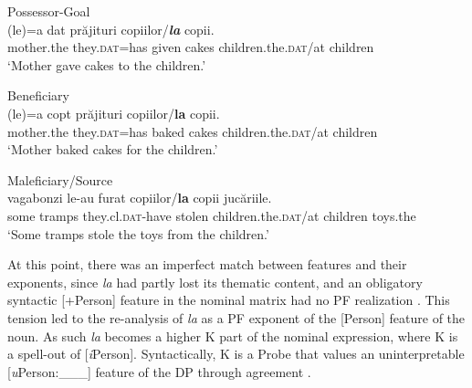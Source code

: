 \documentclass[output=paper,colorlinks,citecolor=brown,nonflat]{./langscibook}
\begin{document}
\ea %
      \label{ex:cornilescu:12}
      Possessor-Goal\\
       {(le)=a} {dat} {prăjituri} copiilor/\textbf{\textit{la}} {copii.} \\
           mother.the they.\textsc{dat}=has given cakes children.the.\textsc{dat}/at children\\
      \glt ‘Mother gave cakes to the children.’
      \z



\ea%
      \label{ex:cornilescu:13}
      Beneficiary \\
       {(le)=a} {copt} prăjituri copiilor/\textbf{{la}} {copii}.\\
             mother.the they.\textsc{dat}=has baked cakes children.the.\textsc{dat}/at children\\
      \glt ‘Mother baked cakes {for} the children.’
      \z


 

\ea%
      \label{ex:cornilescu:14}
      Maleficiary/Source \\
       {vagabonzi} {le-au} {furat} copiilor/\textbf{la} {copii} {jucăriile.} \\
             some tramps they.cl.\textsc{dat-}have stolen children.the.\textsc{dat}/at children toys.the\\
      \glt ‘Some tramps stole the toys from the children.’
      \z

At this point, there was an imperfect match between features and their exponents, since \textit{la} had partly lost its thematic content, and an obligatory syntactic [+Person] feature in the nominal matrix had no PF realization . This tension led to the re-analysis of \textit{la} as a PF exponent of the [Person] feature of the noun. As such \textit{la} becomes a higher K part of the nominal expression, where K is a spell-out of [\textit{i}Person]. Syntactically, K is a Probe that values an uninterpretable [\textit{u}Person:\_\_\_] feature of the DP through agreement .
\end{document}
